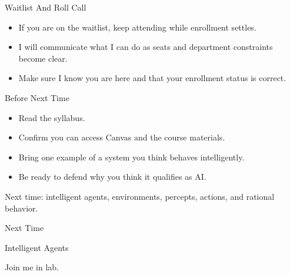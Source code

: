 \documentclass[aspectratio=169]{beamer}
\begin{document}
\begin{frame}{Waitlist And Roll Call}
  \begin{itemize}
    \item If you are on the waitlist, keep attending while enrollment settles.
    \item I will communicate what I can do as seats and department constraints become clear.
    \item Make sure I know you are here and that your enrollment status is correct.
  \end{itemize}
\end{frame}

\begin{frame}{Before Next Time}
  \begin{itemize}
    \item Read the syllabus.
    \item Confirm you can access Canvas and the course materials.
    \item Bring one example of a system you think behaves intelligently.
    \item Be ready to defend why you think it qualifies as AI.
  \end{itemize}
  \vspace{0.16in}
  \begin{keyidea}
    Next time: intelligent agents, environments, percepts, actions, and rational behavior.
  \end{keyidea}
\end{frame}

\begin{frame}{Next Time}
  \begin{center}
    {\Huge Intelligent Agents}
  \end{center}
  \vspace{0.15in}
  \begin{activity}
    Join me in lab.
  \end{activity}
\end{frame}
\end{document}

